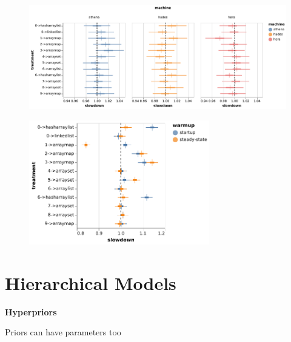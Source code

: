 \documentclass[aspectratio=169,xcolor=svgnames]{beamer}
\begin{document}
\begin{frame}
  \begin{figure}[ht]
    \centering
    \includegraphics[width=\textwidth]{figures/plot_effect_machine_bloat.pdf}
  \end{figure}
\end{frame}

\begin{frame}
  \begin{figure}[ht]
    \centering
    \includegraphics[width=0.7\textwidth]{figures/bayesian-estimate-context-warmup-bloat.pdf}
  \end{figure}
\end{frame}

\section{Hierarchical Models}

\begin{frame}
  \center
  \textbf{Hyperpriors}

  {Priors can have parameters too}

  \pause

  \huge
  {}

\end{frame}
\end{document}
